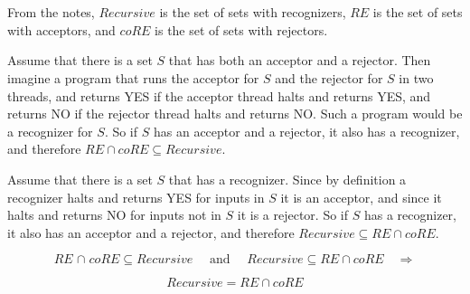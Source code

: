 \documentclass{article}
\begin{document}
\section{}
From the notes, $Recursive$ is the set of sets with recognizers,
$RE$ is the set of sets with acceptors, and $coRE$ is
the set of sets with rejectors.

\vspace{1em}

Assume that there is a set $S$ that has both an acceptor and a rejector. Then
imagine a program that runs the acceptor for $S$ and the rejector for $S$ in
two threads, and returns YES if the acceptor thread halts and returns YES, and
returns NO if the rejector thread halts and returns NO. Such a program would be 
a
recognizer for $S$. So if $S$ has an acceptor and a rejector, it also has a
recognizer, and therefore $RE \cap coRE \subseteq Recursive$.

\vspace{1em}

Assume that there is a set $S$ that has a recognizer. Since 
by definition a recognizer halts
and returns YES for inputs in $S$ it is an acceptor, and since it halts and
returns NO for inputs not in $S$ it is a rejector. So if $S$ has a recognizer,
it also has an acceptor and a rejector, and therefore
$Recursive \subseteq RE \cap coRE$.

\[
RE \hspace{1pt} \cap \hspace{1pt} coRE \subseteq Recursive \hspace{1em}
\text{ and } \hspace{1em}
Recursive \subseteq RE \cap coRE \hspace{1em} \Longrightarrow 
\]

\[
Recursive = RE \cap coRE
\]

\section{}
\end{document}
